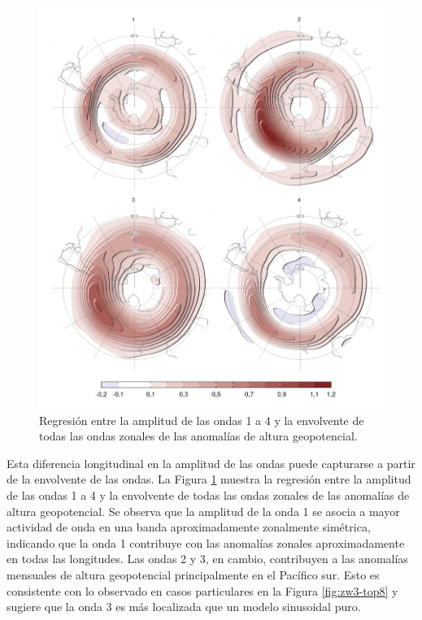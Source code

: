 \documentclass[12pt,oneside,a4paper]{reedthesis}
\begin{document}
\begin{figure}

{\centering \includegraphics{figures/15-onda3/envelope-regr-1} 

}

\caption{Regresión entre la amplitud de las ondas 1 a 4 y la envolvente de todas las ondas zonales de las anomalías de altura geopotencial.}\label{fig:envelope-regr}
\end{figure}



Esta diferencia longitudinal en la amplitud de las ondas puede capturarse a partir de la envolvente de las ondas.
La Figura \ref{fig:envelope-regr} muestra la regresión entre la amplitud de las ondas 1 a 4 y la envolvente de todas las ondas zonales de las anomalías de altura geopotencial.
Se observa que la amplitud de la onda 1 se asocia a mayor actividad de onda en una banda aproximadamente zonalmente simétrica, indicando que la onda 1 contribuye con las anomalías zonales aproximadamente en todas las longitudes.
Las ondas 2 y 3, en cambio, contribuyen a las anomalías mensuales de altura geopotencial principalmente en el Pacífico sur.
Esto es consistente con lo observado en casos particulares en la Figura \ref{fig:zw3-top8} y sugiere que la onda 3 es más localizada que un modelo sinusoidal puro.
\end{document}
